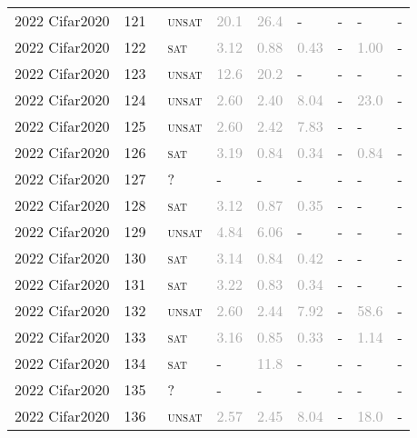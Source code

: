 \begin{center}
{\begin{longtable}{@{}lllllllll@{}}
2022 Cifar2020 & 121 & ~\textsc{unsat} & \textcolor{darkgray}{20.1} & \textcolor{darkgray}{26.4} & - & - & - & - \\
2022 Cifar2020 & 122 & ~\textsc{sat} & \textcolor{darkgray}{3.12} & \textcolor{darkgray}{0.88} & \textcolor{darkgray}{0.43} & - & \textcolor{darkgray}{1.00} & - \\
2022 Cifar2020 & 123 & ~\textsc{unsat} & \textcolor{darkgray}{12.6} & \textcolor{darkgray}{20.2} & - & - & - & - \\
2022 Cifar2020 & 124 & ~\textsc{unsat} & \textcolor{darkgray}{2.60} & \textcolor{darkgray}{2.40} & \textcolor{darkgray}{8.04} & - & \textcolor{darkgray}{23.0} & - \\
2022 Cifar2020 & 125 & ~\textsc{unsat} & \textcolor{darkgray}{2.60} & \textcolor{darkgray}{2.42} & \textcolor{darkgray}{7.83} & - & - & - \\
2022 Cifar2020 & 126 & ~\textsc{sat} & \textcolor{darkgray}{3.19} & \textcolor{darkgray}{0.84} & \textcolor{darkgray}{0.34} & - & \textcolor{darkgray}{0.84} & - \\
2022 Cifar2020 & 127 & ~? & - & - & - & - & - & - \\
2022 Cifar2020 & 128 & ~\textsc{sat} & \textcolor{darkgray}{3.12} & \textcolor{darkgray}{0.87} & \textcolor{darkgray}{0.35} & - & - & - \\
2022 Cifar2020 & 129 & ~\textsc{unsat} & \textcolor{darkgray}{4.84} & \textcolor{darkgray}{6.06} & - & - & - & - \\
2022 Cifar2020 & 130 & ~\textsc{sat} & \textcolor{darkgray}{3.14} & \textcolor{darkgray}{0.84} & \textcolor{darkgray}{0.42} & - & - & - \\
2022 Cifar2020 & 131 & ~\textsc{sat} & \textcolor{darkgray}{3.22} & \textcolor{darkgray}{0.83} & \textcolor{darkgray}{0.34} & - & - & - \\
2022 Cifar2020 & 132 & ~\textsc{unsat} & \textcolor{darkgray}{2.60} & \textcolor{darkgray}{2.44} & \textcolor{darkgray}{7.92} & - & \textcolor{darkgray}{58.6} & - \\
2022 Cifar2020 & 133 & ~\textsc{sat} & \textcolor{darkgray}{3.16} & \textcolor{darkgray}{0.85} & \textcolor{darkgray}{0.33} & - & \textcolor{darkgray}{1.14} & - \\
2022 Cifar2020 & 134 & ~\textsc{sat} & - & \textcolor{darkgray}{11.8} & - & - & - & - \\
2022 Cifar2020 & 135 & ~? & - & - & - & - & - & - \\
2022 Cifar2020 & 136 & ~\textsc{unsat} & \textcolor{darkgray}{2.57} & \textcolor{darkgray}{2.45} & \textcolor{darkgray}{8.04} & - & \textcolor{darkgray}{18.0} & - \\

\end{longtable}}
\end{center}

